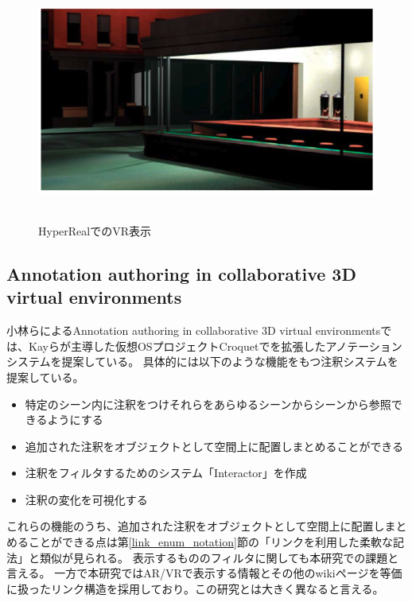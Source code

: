 \begin{figure}[h]
  \centering 
  \includegraphics[height=80mm]{images/HyperReal_vr.png}
  \caption{HyperRealでのVR表示} \label{fig:HyperReal_vr}
\end{figure}


\subsection{Annotation authoring in collaborative 3D virtual environments}
小林らによるAnnotation authoring in collaborative 3D virtual environments\cite{10.1145/1152399.1152452}では、Kayらが主導した仮想OSプロジェクトCroquet\cite{10.5555/1009376.1009395}でを拡張したアノテーションシステムを提案している。
具体的には以下のような機能をもつ注釈システムを提案している。
\begin{itemize} 
  \item 特定のシーン内に注釈をつけそれらをあらゆるシーンからシーンから参照できるようにする
  \item 追加された注釈をオブジェクトとして空間上に配置しまとめることができる
  \item 注釈をフィルタするためのシステム「Interactor」を作成
  \item 注釈の変化を可視化する
\end{itemize}
これらの機能のうち、追加された注釈をオブジェクトとして空間上に配置しまとめることができる点は第\ref{link_enum_notation}節の「リンクを利用した柔軟な記法」と類似が見られる。
表示するもののフィルタに関しても本研究での課題と言える。
一方で本研究ではAR/VRで表示する情報とその他のwikiページを等価に扱ったリンク構造を採用しており。この研究とは大きく異なると言える。

